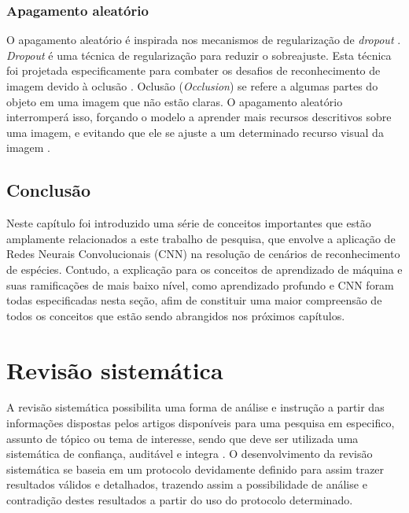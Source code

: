 \documentclass[
	12pt,				%
	oneside,			%
	a4paper,			%
	english,			%
	brazil				%
	]{abntex2ppgsi}
\begin{document}
\subsection{Apagamento aleatório}
O apagamento aleatório é inspirada nos mecanismos de regularização de \textit{dropout} \cite{shorten2019survey}. \textit{Dropout} é uma técnica de regularização para reduzir o sobreajuste. Esta técnica foi projetada especificamente para combater os desafios de reconhecimento de imagem devido à oclusão \cite{shorten2019survey}. Oclusão (\textit{Occlusion}) se refere a algumas partes do objeto em uma imagem que não estão claras. O apagamento aleatório interromperá isso, forçando o modelo a aprender mais recursos descritivos sobre uma imagem, e evitando que ele se ajuste a um determinado recurso visual da imagem \cite{shorten2019survey}.

\section{Conclusão}
Neste capítulo foi introduzido uma série de conceitos importantes que estão amplamente relacionados a este trabalho de pesquisa, que envolve a aplicação de Redes Neurais Convolucionais (CNN) na resolução de cenários de reconhecimento de espécies. Contudo, a explicação para os conceitos de aprendizado de máquina e suas ramificações de mais baixo nível, como aprendizado profundo e CNN foram todas especificadas nesta seção, afim de constituir uma maior compreensão de todos os conceitos que estão sendo abrangidos nos próximos capítulos.

\chapter{Revisão sistemática}
A revisão sistemática possibilita uma forma de análise e instrução a partir das informações dispostas pelos artigos disponíveis para uma pesquisa em especifico, assunto de tópico ou tema de interesse, sendo que deve ser utilizada uma sistemática de confiança, auditável e integra \cite{garcia2020guidelines}.
O desenvolvimento da revisão sistemática se baseia em um protocolo devidamente definido para assim trazer resultados válidos e detalhados, trazendo assim a possibilidade de análise e contradição destes resultados a partir do uso do protocolo determinado.
\end{document}

